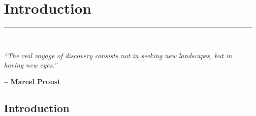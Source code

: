 \chapter{Introduction}%
\label{chp:introduction}
\rule{\textwidth}{1pt} \\[1ex]

\epigraph{\textit{``The real voyage of discovery consists not in seeking new landscapes, but in having new eyes.''}}{\textbf{-- Marcel Proust}}

\section{Introduction}
\label{sec:1_introduction}



